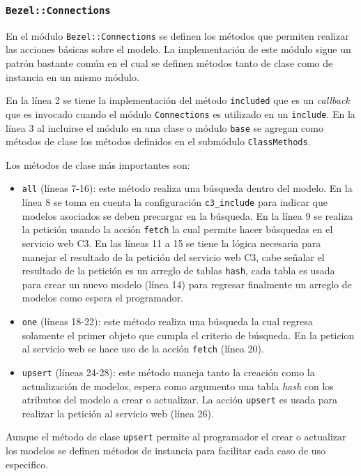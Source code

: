 \subsubsection{\texttt{Bezel::Connections}}

En el módulo \texttt{Bezel::Connections} se definen los métodos que permiten
realizar las acciones básicas sobre el modelo. La implementación de este módulo
sigue un patrón bastante común en el cual se definen métodos tanto de clase
como de instancia en un mismo módulo.



En la línea 2 se tiene la implementación del método \texttt{included} que es un
\textit{callback} que es invocado cuando el módulo \texttt{Connections} es
utilizado en un \texttt{include}. En la línea 3 al incluirse el módulo en una
clase o módulo \texttt{base} se agregan como métodos de clase los métodos
definidos en el submódulo \texttt{ClassMethods}.

Los métodos de clase más importantes son:
\begin{itemize}
\item \texttt{all} (líneas 7-16): este método realiza una búsqueda dentro del modelo.
  En la línea 8 se toma en cuenta la configuración \texttt{c3\_include} para indicar
  que modelos asociados se deben precargar en la búsqueda. En la línea 9 se realiza
  la petición usando la acción \texttt{fetch} la cual permite hacer búsquedas
  en el servicio web C3. En las líneas 11 a 15 se tiene la lógica necesaria para
  manejar el resultado de la petición del servicio web C3, cabe señalar el resultado
  de la petición es un arreglo de tablas \texttt{hash}, cada tabla es usada
  para crear un nuevo modelo (línea 14) para regresar finalmente un arreglo de
  modelos como espera el programador.
\item \texttt{one} (líneas 18-22): este método realiza una búsqueda la cual
  regresa solamente el primer objeto que cumpla el criterio de búsqueda. En la
  peticion al servicio web se hace uso de la acción \texttt{fetch} (línea 20).
\item \texttt{upsert} (líneas 24-28): este método maneja tanto la creación como la
  actualización de modelos, espera como argumento una tabla \textit{hash} con los
  atributos del modelo a crear o actualizar. La acción \texttt{upsert} es usada
  para realizar la petición al servicio web (línea 26).
\end{itemize}

Aunque el método de clase \texttt{upsert} permite al programador el crear o
actualizar los modelos se definen métodos de instancia para facilitar cada
caso de uso especifico.

